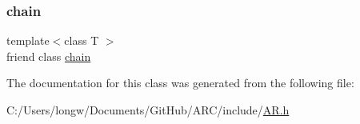 \subsubsection{\texorpdfstring{chain}{chain}}
{\footnotesize\ttfamily template$<$class T $>$ \\
friend class \hyperlink{classARC_1_1chain}{chain}\hspace{0.3cm}{\ttfamily [friend]}}



The documentation for this class was generated from the following file\+:\begin{DoxyCompactItemize}
\item 
C\+:/\+Users/longw/\+Documents/\+Git\+Hub/\+A\+R\+C/include/\hyperlink{AR_8h}{A\+R.\+h}\end{DoxyCompactItemize}
